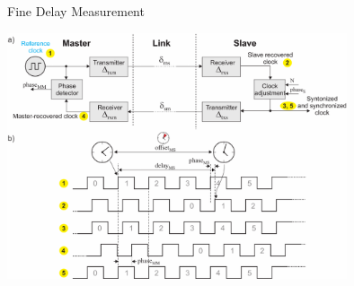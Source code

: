 \documentclass[compress,red]{beamer}
\begin{document}
\begin{frame}{Fine Delay Measurement}

  \begin{center}
  \includegraphics[width=10.0cm]{protocol/link_model.pdf}
  \end{center}

\end{frame}
\end{document}
